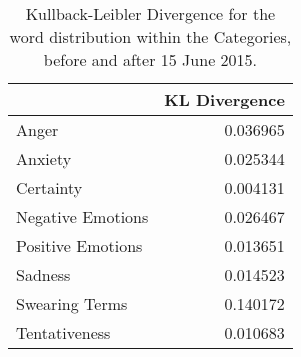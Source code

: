 \begin{table}[h]\centering
\caption{Kullback-Leibler Divergence for the word distribution within the Categories, before and after 15 June 2015.}
	\label{fig: Kullback_1}
	\begin{tabular}{lr}
	\toprule
	{} &  KL Divergence \\
	\midrule
	Anger             &       0.036965 \\
	Anxiety           &       0.025344 \\
	Certainty         &       0.004131 \\
	Negative Emotions &       0.026467 \\
	Positive Emotions &       0.013651 \\
	Sadness           &       0.014523 \\
	Swearing Terms    &       0.140172 \\
	Tentativeness     &       0.010683 \\
	\bottomrule
	\end{tabular}
	
\end{table}

